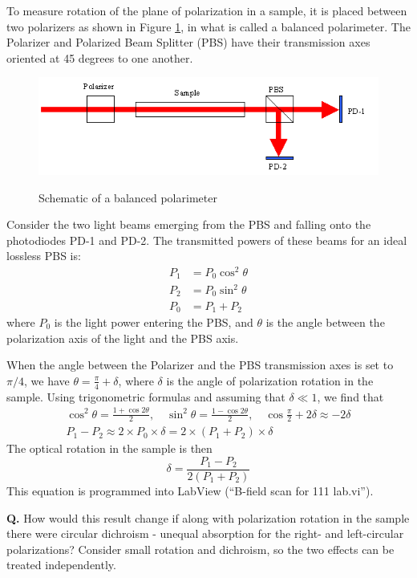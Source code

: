 \documentclass{../lab}
\begin{document}
To measure rotation of the plane of polarization in a sample, it is placed between two polarizers as shown in Figure \ref{fig:SchematicOfBalancedPolarimeter}, in what is called a balanced polarimeter. The Polarizer and Polarized Beam Splitter (PBS) have their transmission axes oriented at 45 degrees to one another.

\begin{figure}[h]
    \centering
    \href{http://experimentationlab.berkeley.edu/sites/default/files/images/MNOimage008.gif}{\includegraphics[width=0.5\linewidth]{images/MNOimage008.png}}
    \caption{Schematic of a balanced polarimeter}
    \label{fig:SchematicOfBalancedPolarimeter}
\end{figure}

Consider the two light beams emerging from the PBS and falling onto the photodiodes PD-1 and PD-2. The transmitted powers of these beams for an ideal lossless PBS is:
\begin{align*}
    P_1 &= P_0\cos^2{\theta} \\
    P_2 &= P_0\sin^2{\theta} \\
    P_0 &= P_1+P_2
\end{align*}
where $P_0$ is the light power entering the PBS, and $\theta$ is the angle between the polarization axis of the light and the PBS axis.

When the angle between the Polarizer and the PBS transmission axes is set to $\pi/4$, we have $\theta = \frac{\pi}{4}+\delta $, where $ \delta $ is the angle of polarization rotation in the sample. Using trigonometric formulas and assuming that $\delta \ll 1$, we find that
\begin{gather*}
    \cos^2{\theta} = \frac{1+\cos{2\theta}}{2}, \quad \sin^2{\theta} = \frac{1-\cos{2\theta}}{2}, \quad \cos{\frac{\pi}{2} + 2\delta} \approx -2\delta \\
    P_1 - P_2 \approx 2\times P_0 \times \delta = 2 \times (P_1 + P_2) \times \delta
\end{gather*}
The optical rotation in the sample is then
\[
    \delta = \frac{P_1 - P_2}{2(P_1 + P_2)}
\]
This equation is programmed into LabView (``B-field scan for 111 lab.vi'').

\textbf{Q.} How would this result change if along with polarization rotation in the sample there were circular dichroism - unequal absorption for the right- and left-circular polarizations? Consider small rotation and dichroism, so the two effects can be treated independently.
\end{document}

